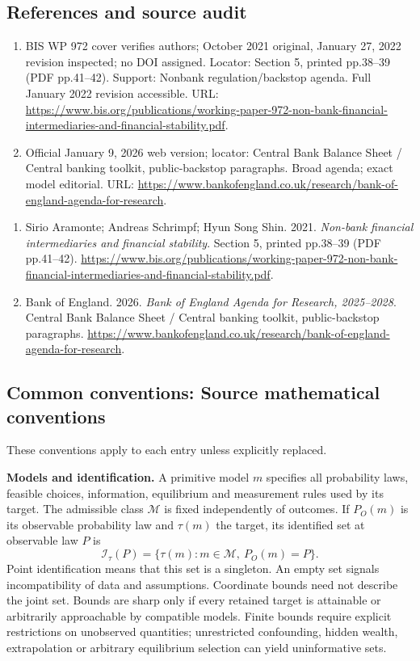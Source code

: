 \documentclass[11pt,a4paper]{article}
\begin{document}
\subsection*{References and source audit}
\begin{enumerate}
\item BIS WP 972 cover verifies authors; October 2021 original, January 27, 2022 revision inspected; no DOI assigned. Locator: Section 5, printed pp.38--39 (PDF pp.41--42). Support: Nonbank regulation/backstop agenda. Full January 2022 revision accessible. URL: \url{https://www.bis.org/publications/working-paper-972-non-bank-financial-intermediaries-and-financial-stability.pdf}.
\item Official January 9, 2026 web version; locator: Central Bank Balance Sheet / Central banking toolkit, public-backstop paragraphs. Broad agenda; exact model editorial. URL: \url{https://www.bankofengland.co.uk/research/bank-of-england-agenda-for-research}.
\end{enumerate}
\begin{enumerate}\raggedright
\item\hypertarget{definitions:source:30007608:1}{} Sirio Aramonte; Andreas Schrimpf; Hyun Song Shin. 2021. \emph{Non-bank financial intermediaries and financial stability}. Section 5, printed pp.38--39 (PDF pp.41--42).
\url{https://www.bis.org/publications/working-paper-972-non-bank-financial-intermediaries-and-financial-stability.pdf}.
\item\hypertarget{definitions:source:30007608:2}{} Bank of England. 2026. \emph{Bank of England Agenda for Research, 2025–2028}. Central Bank Balance Sheet / Central banking toolkit, public-backstop paragraphs.
\url{https://www.bankofengland.co.uk/research/bank-of-england-agenda-for-research}.
\end{enumerate}

\subsection*{Common conventions: Source mathematical conventions}

These conventions apply to each entry unless explicitly replaced.

\textbf{Models and identification.} A primitive model \(m\) specifies all probability laws, feasible choices, information, equilibrium and measurement rules used by its target. The admissible class \(\mathcal M\) is fixed independently of outcomes. If \(P_O(m)\) is its observable probability law and \(\tau(m)\) the target, its identified set at observable law \(P\) is
\[
 \mathcal I_\tau(P)=\{\tau(m):m\in\mathcal M,\ P_O(m)=P\}.
\]
Point identification means that this set is a singleton. An empty set signals incompatibility of data and assumptions. Coordinate bounds need not describe the joint set. Bounds are sharp only if every retained target is attainable or arbitrarily approachable by compatible models. Finite bounds require explicit restrictions on unobserved quantities; unrestricted confounding, hidden wealth, extrapolation or arbitrary equilibrium selection can yield uninformative sets.
\end{document}
